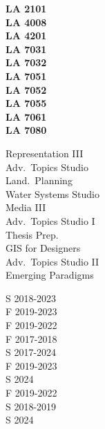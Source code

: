 \documentclass[10pt]{designcv}
\begin{document}

\printbibliography[title={\cvsect{Awards}\vspace*{-2em}}, keyword=awards, heading=subbibliography]



\begin{minipage}[t]{0.1\textwidth} 
\textbf{LA 2101}\\
\textbf{LA 4008}\\
\textbf{LA 4201}\\
\textbf{LA 7031}\\
\textbf{LA 7032}\\
\textbf{LA 7051}\\
\textbf{LA 7052}\\
\textbf{LA 7055}\\
\textbf{LA 7061}\\
\textbf{LA 7080}\\
\end{minipage}
\begin{minipage}[t]{0.24\textwidth} 
Representation III\\
Adv.~Topics Studio\\
Land.~Planning \\
Water Systems Studio\\
Media III\\
Adv.~Topics Studio I\\
Thesis Prep.\\
GIS for Designers\\
Adv.~Topics Studio II\\
Emerging Paradigms\\
\end{minipage}
\begin{minipage}[t]{0.17\textwidth} 
S 2018-2023\\
F 2019-2023\\
F 2019-2022\\
F 2017-2018\\
S 2017-2024\\
F 2019-2023\\
S 2024\\
F 2019-2022\\
S 2018-2019\\
S 2024\\
\end{minipage}
\end{document}
